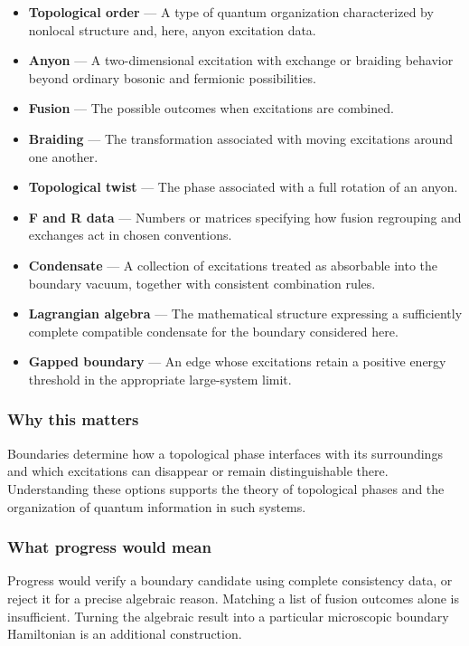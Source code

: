 \documentclass[
  11pt,
]{article}
\begin{document}
\begin{itemize}
\item
  \textbf{Topological order} --- A type of quantum organization
  characterized by nonlocal structure and, here, anyon excitation data.
\item
  \textbf{Anyon} --- A two-dimensional excitation with exchange or
  braiding behavior beyond ordinary bosonic and fermionic possibilities.
\item
  \textbf{Fusion} --- The possible outcomes when excitations are
  combined.
\item
  \textbf{Braiding} --- The transformation associated with moving
  excitations around one another.
\item
  \textbf{Topological twist} --- The phase associated with a full
  rotation of an anyon.
\item
  \textbf{F and R data} --- Numbers or matrices specifying how fusion
  regrouping and exchanges act in chosen conventions.
\item
  \textbf{Condensate} --- A collection of excitations treated as
  absorbable into the boundary vacuum, together with consistent
  combination rules.
\item
  \textbf{Lagrangian algebra} --- The mathematical structure expressing
  a sufficiently complete compatible condensate for the boundary
  considered here.
\item
  \textbf{Gapped boundary} --- An edge whose excitations retain a
  positive energy threshold in the appropriate large-system limit.
\end{itemize}

\subsubsection{Why this matters}

Boundaries determine how a topological phase interfaces with its
surroundings and which excitations can disappear or remain
distinguishable there. Understanding these options supports the theory
of topological phases and the organization of quantum information in
such systems.

\subsubsection{What progress would mean}

Progress would verify a boundary candidate using complete consistency
data, or reject it for a precise algebraic reason. Matching a list of
fusion outcomes alone is insufficient. Turning the algebraic result into
a particular microscopic boundary Hamiltonian is an additional
construction.
\end{document}
